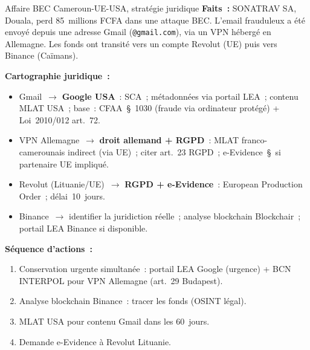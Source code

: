 \begin{boxscenario}{Affaire BEC Cameroun-UE-USA, stratégie juridique}
\textbf{Faits~:} SONATRAV SA, Douala, perd 85~millions FCFA dans une
attaque BEC. L'email frauduleux a été envoyé depuis une adresse Gmail
(\texttt{@gmail.com}), via un VPN hébergé en Allemagne. Les fonds ont
transité vers un compte Revolut (UE) puis vers Binance (Caïmans).

\textbf{Cartographie juridique~:}
\begin{itemize}
    \item Gmail~$\to$ \textbf{Google USA}~: SCA~; métadonnées via portail
          LEA~; contenu MLAT USA~; base~: CFAA~\S~1030 (fraude via
          ordinateur protégé) + Loi~2010/012 art.~72.
    \item VPN Allemagne~$\to$ \textbf{droit allemand + RGPD}~: MLAT
          franco-camerounais indirect (via UE)~; citer art.~23 RGPD~;
          e-Evidence~\S~si partenaire UE impliqué.
    \item Revolut (Lituanie/UE)~$\to$ \textbf{RGPD + e-Evidence}~:
          European Production Order~; délai~10~jours.
    \item Binance~$\to$ identifier la juridiction réelle~; analyse
          blockchain Blockchair~; portail LEA Binance si disponible.
\end{itemize}

\textbf{Séquence d'actions~:}
\begin{enumerate}
    \item Conservation urgente simultanée~: portail LEA Google (urgence)
          + BCN INTERPOL pour VPN Allemagne (art.~29 Budapest).
    \item Analyse blockchain Binance~: tracer les fonds (OSINT légal).
    \item MLAT USA pour contenu Gmail dans les 60~jours.
    \item Demande e-Evidence à Revolut Lituanie.
\end{enumerate}
\end{boxscenario}

\separateur

